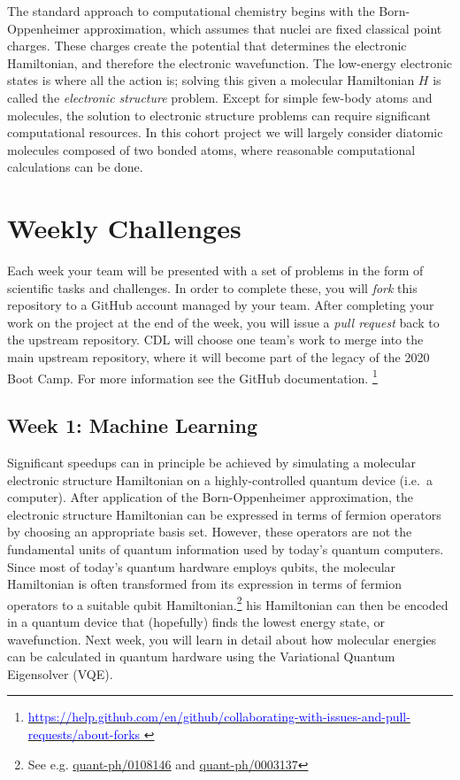 \documentclass[12pt]{article}
\begin{document}
The standard approach to computational chemistry begins with the Born-Oppenheimer approximation, which assumes that nuclei are fixed classical point charges. These charges create the potential that determines the electronic Hamiltonian, and therefore the electronic wavefunction.  
The low-energy electronic states is where all the action is; solving this given a molecular Hamiltonian $H$ is
called the {\it electronic structure} problem.
Except for simple few-body atoms and molecules, the solution to electronic structure problems can require significant computational resources.  In this cohort project we will largely consider diatomic molecules composed of two bonded atoms, where reasonable computational calculations can be done.


\newpage

\section{Weekly Challenges}

Each week your team will be presented with a set of problems in the form of scientific tasks and challenges.  In order to complete these, you will {\it fork} this repository to a GitHub account managed by your team.  After completing your work on the project at the end of the week, you will issue a {\it pull request} back to the upstream repository.
CDL will choose one team's work to merge into the main upstream repository, where it will become part of the legacy of the 2020 Boot Camp.  For more information see the
GitHub documentation.
\footnote{
\href{https://help.github.com/en/github/collaborating-with-issues-and-pull-requests/about-forks}{\textcolor{blue}{https://help.github.com/en/github/collaborating-with-issues-and-pull-requests/about-forks} } }

\subsection{Week 1: Machine Learning}

Significant speedups can in principle be achieved by simulating a molecular electronic structure Hamiltonian
on a highly-controlled quantum device (i.e.~a computer).  
After application of the Born-Oppenheimer approximation, the electronic structure Hamiltonian can be 
expressed in terms of fermion operators by choosing an appropriate basis set.  However, these operators
are not the fundamental units of quantum information used by today's quantum computers.
Since most of today's quantum hardware employs qubits, 
the molecular Hamiltonian is often transformed from its expression in terms of fermion operators 
to a suitable qubit Hamiltonian.\footnote{See e.g. \href{https://arxiv.org/abs/quant-ph/0108146}{quant-ph/0108146} and \href{https://arxiv.org/abs/quant-ph/0003137}{quant-ph/0003137} }
his Hamiltonian can then be encoded in a quantum device that (hopefully)
finds the lowest energy state, or wavefunction.
Next week, you will learn in detail about how molecular energies can be calculated in quantum hardware using 
the Variational Quantum Eigensolver (VQE).
\end{document}

